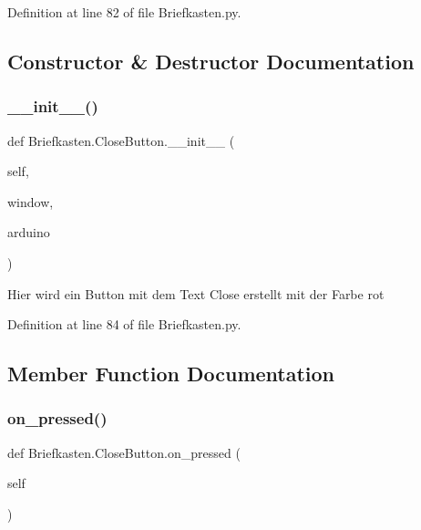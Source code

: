 Definition at line 82 of file Briefkasten.\+py.



\subsection{Constructor \& Destructor Documentation}
\mbox{\label{class_briefkasten_1_1_close_button_a57c38a153335303e875213e039638312}} 
\subsubsection{\texorpdfstring{\+\_\+\+\_\+init\+\_\+\+\_\+()}{\_\_init\_\_()}}
{\footnotesize\ttfamily def Briefkasten.\+Close\+Button.\+\_\+\+\_\+init\+\_\+\+\_\+ (\begin{DoxyParamCaption}\item[{}]{self,  }\item[{}]{window,  }\item[{}]{arduino }\end{DoxyParamCaption})}

\begin{DoxyVerb}Hier wird ein Button mit dem Text Close erstellt mit der Farbe rot\end{DoxyVerb}
 

Definition at line 84 of file Briefkasten.\+py.



\subsection{Member Function Documentation}
\mbox{\label{class_briefkasten_1_1_close_button_ac776171d33d0642d14632a44517a83cb}} 
\subsubsection{\texorpdfstring{on\+\_\+pressed()}{on\_pressed()}}
{\footnotesize\ttfamily def Briefkasten.\+Close\+Button.\+on\+\_\+pressed (\begin{DoxyParamCaption}\item[{}]{self }\end{DoxyParamCaption})}



